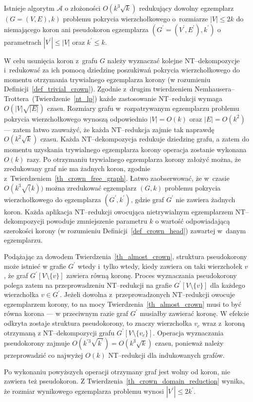 {  \begin{theorem}
    Istnieje algorytm $\mathcal{A}$ o złożoności $O(k^3\sqrt{k})$ redukujący dowolny egzemplarz $(G=(V, E), k)$ problemu pokrycia wierzchołkowego o~rozmiarze $|V|\leq 2k$ do niemającego koron ani pseudokoron egzemplarza $(G^\prime=(V^\prime, E^\prime), k^\prime)$ o parametrach $|V^\prime| \leq |V|$ oraz $k^\prime \leq k$.
  \end{theorem}
  \begin{bproof}
    W celu usunięcia koron z~grafu $G$ należy wyznaczać kolejne NT--dekompozycje i~redukować za ich pomocą dziedzinę poszukiwań pokrycia wierzchołkowego do momentu otrzymania trywialnego egzemplarza korony (w rozumieniu Definicji~\ref{def_trivial_crown}).
    Zgodnie z~drugim twierdzeniem Nemhausera--Trottera~(Twierdzenie~\ref{nt_lp}) każde zastosowanie NT--redukcji wymaga $O(|V|\sqrt{|E|})$ czasu.
    Rozmiary grafu w~rozpatrywanym egzemplarzu problemu pokrycia wierzchołkowego wynoszą odpowiednio $|V|=O(k)$ oraz $|E|=O(k^2)$ --- zatem łatwo zauważyć, że każda NT--redukcja zajmie tak naprawdę $O(k^2\sqrt{k})$ czasu.
    Każda NT--dekompozycja redukuje dziedzinę grafu, a zatem do momentu uzyskania trywialnego egzemplarza korony operacja zostanie wykonana $O(k)$ razy.
    Po otrzymaniu trywialnego egzemplarza korony założyć można, że zredukowany graf nie ma żadnych koron, zgodnie z~Twierdzeniem~\ref{th_crown_free_graph}.
    Łatwo zaobserwować, że w~czasie $O(k^3\sqrt(k))$ można zredukować egzemplarz $(G, k)$ problemu pokrycia wierzchołkowego do egzemplarza $(G^\prime, k^\prime)$, gdzie graf $G^\prime$ nie zawiera żadnych koron.
    Każda aplikacja NT--redukcji owocująca nietrywialnym egzemplarzem NT--dekompozycji powoduje zmniejszenie parametru $k$ o wartość odpowiadającą szerokości korony (w rozumieniu Definicji~\ref{def_crown_head}) zawartej w~danym egzemplarzu.

    Podążając za dowodem Twierdzenia~\ref{th_almost_crown}, struktura pseudokorony może istnieć w grafie $G^\prime$ wtedy i~tylko wtedy, kiedy zawiera on taki wierzchołek $v$, że graf $G^\prime[V \setminus \{v\}]$ zawiera równą koronę.
    Proces wyznaczania pseudokorony polega zatem na przeprowadzeniu NT--redukcji na grafie $G^\prime[V \setminus \{v\}]$ dla każdego wierzchołka $v \in G^\prime$.
    Jeżeli dowolna z~przeprowadzonych NT--redukcji owocuje egzemplarzem korony, to na mocy Twierdzenia~\ref{th_almost_crown} musi to być równa korona --- w przeciwnym razie graf $G^\prime$ musiałby zawierać koronę.
    W efekcie odkryta zostaje struktura pseudokorony, to znaczy wierzchołka $v_c$ wraz z~koroną otrzymaną z NT--dekompozycji grafu $G^\prime[V \setminus \{v_c\}]$.
    Operacja wyznaczania pseudokorony zajmuje $O(k^{\prime3}\sqrt{k^\prime})=O(k^3\sqrt{k})$ czasu, ponieważ należy przeprowadzić co najwyżej $O(k)$ NT--redukcji dla indukowanych grafów.

    Po wykonaniu powyższych operacji otrzymany graf jest wolny od koron, nie zawiera też pseudokoron.
    Z Twierdzenia~\ref{th_crown_domain_reduction} wynika, że rozmiar wynikowego egzemplarza problemu wynosi $|V^\prime| \leq 2k^\prime$.
  \end{bproof}
}
